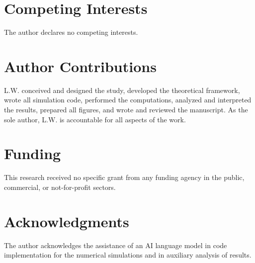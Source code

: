 \documentclass[11pt]{article}
\begin{document}
\section*{Competing Interests}
The author declares no competing interests.

\section*{Author Contributions}
L.W. conceived and designed the study, developed the theoretical framework, wrote all simulation code, performed the computations, analyzed and interpreted the results, prepared all figures, and wrote and reviewed the manuscript. As the sole author, L.W. is accountable for all aspects of the work.

\section*{Funding}
This research received no specific grant from any funding agency in the public, commercial, or not-for-profit sectors.

\section*{Acknowledgments}
The author acknowledges the assistance of an AI language model in code implementation for the numerical simulations and in auxiliary analysis of results.



\end{document}
